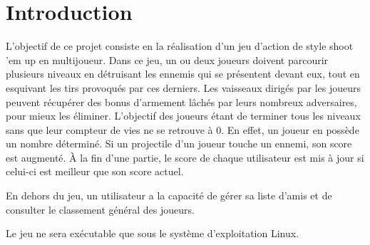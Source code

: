 \documentclass[a4paper,12pt]{article}
\begin{document}
\begin{titlepage}
\begin{center}
        \end{center}

    \end{titlepage}

\newpage

\tableofcontents

\newpage


\section{Introduction}

L’objectif de ce projet consiste en la réalisation d'un jeu d'action de style shoot 'em up en multijoueur. Dans ce jeu, un ou deux joueurs doivent parcourir plusieurs niveaux en détruisant les ennemis qui se présentent devant eux, tout en esquivant les tirs provoqués par ces derniers. Les vaisseaux dirigés par les joueurs peuvent récupérer des bonus d’armement lâchés par leurs nombreux adversaires, pour mieux les éliminer. L'objectif des joueurs étant de terminer tous les niveaux sans que leur compteur de vies ne se retrouve à 0. En effet, un joueur en possède un nombre déterminé. Si un projectile d'un joueur touche un ennemi, son score est augmenté. À la fin d'une partie, le score de chaque utilisateur est mis à jour si celui-ci est meilleur que son score actuel.

En dehors du jeu, un utilisateur a la capacité de gérer sa liste d'amis et de consulter le classement général des joueurs.

Le jeu ne sera exécutable que sous le système d'exploitation Linux.
\end{document}
